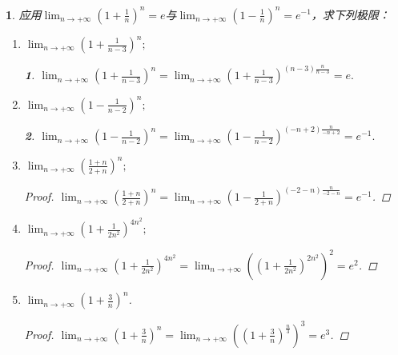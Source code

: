 \documentclass[utf8]{book}
\newtheorem{example}{}[section]             %
\newtheorem{solution}{}
\begin{document}
\begin{example}
应用$\displaystyle \lim_{n\to +\infty}\left(1+\frac{1}{n}\right)^n = e$与$\displaystyle \lim_{n\to +\infty}\left(1-\frac{1}{n}\right)^n = e^{-1}$，求下列极限：
\renewcommand\labelenumi{\normalfont(\theenumi)}
\begin{enumerate}
\item $\displaystyle \lim_{n\to +\infty}\left(1+\frac{1}{n-3}\right)^n;$
\begin{solution}
$\displaystyle \lim_{n\to +\infty}\left(1+\frac{1}{n-3}\right)^n=\displaystyle \lim_{n\to +\infty}\left(1+\frac{1}{n-3}\right)^{(n-3)\frac{n}{n-3}}=e.$
\end{solution}
\item $\displaystyle \lim_{n\to +\infty}\left(1-\frac{1}{n-2}\right)^n;$
\begin{solution}
$\displaystyle \lim_{n\to +\infty}\left(1-\frac{1}{n-2}\right)^n=\displaystyle \lim_{n\to +\infty}\left(1-\frac{1}{n-2}\right)^{(-n+2)\frac{n}{-n+2}}=e^{-1}.$
\end{solution}
\item $\displaystyle \lim_{n\to +\infty}\left(\frac{1+n}{2+n}\right)^n;$
\begin{proof}
$\displaystyle \lim_{n\to +\infty}\left(\frac{1+n}{2+n}\right)^n = \lim_{n\to +\infty}\left(1-\frac{1}{2+n}\right)^{(-2-n)\frac{n}{-2-n}}=e^{-1}$.
\end{proof}
\item $\displaystyle \lim_{n\to +\infty}\left(1+\frac{1}{2n^2}\right)^{4n^2};$
\begin{proof}
$\displaystyle \lim_{n\to +\infty}\left(1+\frac{1}{2n^2}\right)^{4n^2} = \lim_{n\to +\infty}\left(\left(1+\frac{1}{2n^2}\right)^{2n^2}\right)^2=e^2$.
\end{proof}
\item $\displaystyle \lim_{n\to +\infty}\left(1+\frac{3}{n}\right)^{n}$.
\begin{proof}
$\displaystyle \lim_{n\to +\infty}\left(1+\frac{3}{n}\right)^{n}=\lim_{n\to +\infty}\left(\left(1+\frac{3}{n}\right)^{\frac{n}{3}}\right)^3=e^3$.
\end{proof}
\end{enumerate}
\end{example}
\end{document}
